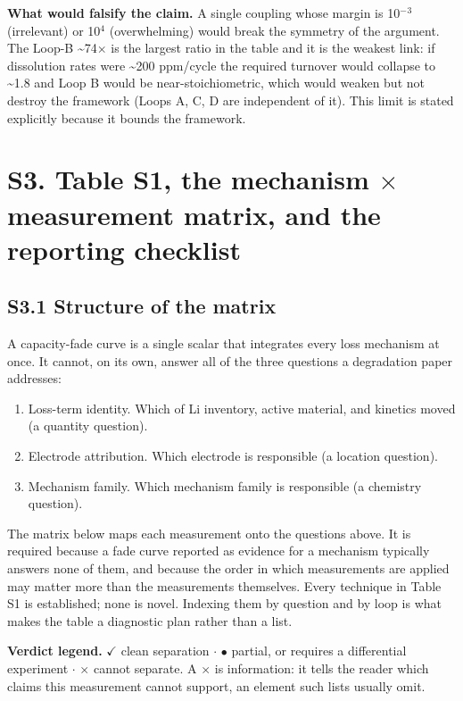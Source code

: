 \documentclass[11pt,a4paper]{article}
\begin{document}
\textbf{What would falsify the claim.} A single coupling whose margin is 10\ensuremath{^{-}}\ensuremath{^{3}} (irrelevant) or 10\ensuremath{^{4}} (overwhelming) would break the symmetry of the argument. The Loop-B \textasciitilde{}74\ensuremath{\times} is the largest ratio in the table and it is the weakest link: if dissolution rates were \textasciitilde{}200 ppm/cycle the required turnover would collapse to \textasciitilde{}1.8 and Loop B would be near-stoichiometric, which would weaken but not destroy the framework (Loops A, C, D are independent of it). This limit is stated explicitly because it bounds the framework.


\section*{S3. Table S1, the mechanism \ensuremath{\times} measurement matrix, and the reporting checklist}


\subsection*{S3.1 Structure of the matrix}


A capacity-fade curve is a single scalar that integrates every loss mechanism at once. It cannot, on its own, answer all of the three questions a degradation paper addresses:


\begin{enumerate}
  \item Loss-term identity. Which of Li inventory, active material, and kinetics moved (a quantity question).
  \item Electrode attribution. Which electrode is responsible (a location question).
  \item Mechanism family. Which mechanism family is responsible (a chemistry question).
\end{enumerate}


The matrix below maps each measurement onto the questions above. It is required because a fade curve reported as evidence for a mechanism typically answers none of them, and because the order in which measurements are applied may matter more than the measurements themselves. Every technique in Table S1 is established; none is novel. Indexing them by question and by loop is what makes the table a diagnostic plan rather than a list.


\textbf{Verdict legend.} \ensuremath{\checkmark} clean separation \ensuremath{\cdot} \ensuremath{\bullet} partial, or requires a differential experiment \ensuremath{\cdot} \ensuremath{\boldsymbol{\times}} cannot separate. A \ensuremath{\boldsymbol{\times}} is information: it tells the reader which claims this measurement cannot support, an element such lists usually omit.
\end{document}
